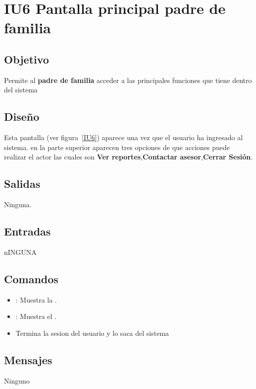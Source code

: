 \newpage
\section{IU6 Pantalla principal padre de familia}

\subsection{Objetivo}
	Permite al {\bf padre de familia} acceder a las principales funciones que tiene dentro del sistema

\subsection{Diseño}
	Esta pantalla  (ver figura~\ref{IU6}) aparece una vez que el usuario ha ingresado al sistema. 
 en la parte superior aparecen tres opciones de que acciones puede realizar el actor las cuales son {\bf Ver reportes},{\bf Contactar asesor},{\bf Cerrar Sesión}. 

 

\subsection{Salidas}

	Ninguna.

\subsection{Entradas}
nINGUNA

\subsection{Comandos}
\begin{itemize}
	\item {}: Muestra la .
	\item {}: Muestra el .
          \item {}Termina la sesion del usuario y lo saca del sistema
\end{itemize}

\subsection{Mensajes}

\begin{Citemize}
	\item Ninguno
\end{Citemize}

